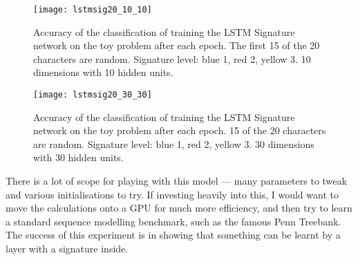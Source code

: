         \begin{figure}
	\texttt{[image: lstmsig20\_10\_10]}
          \caption[LSTM Signature training accuracy -- 10D with 10 hidden units]{Accuracy of the classification of training the LSTM Signature network on the toy problem after each epoch. The first 15 of the 20 characters are random. Signature level: blue 1, red 2, yellow 3. 10 dimensions with 10 hidden units.}
          \label{fig:lstmsig201010}
        \end{figure}
        \begin{figure}
	\texttt{[image: lstmsig20\_30\_30]}
          \caption[LSTM Signature training accuracy -- 30D with 30 hidden units]{Accuracy of the classification of training the LSTM Signature network on the toy problem after each epoch. 15 of the 20 characters are random. Signature level: blue 1, red 2, yellow 3. 30 dimensions with 30 hidden units.}
          \label{fig:lstmsig203030}
        \end{figure}

There is a lot of scope for playing with this model --- many parameters to tweak and various initialisations to try. If investing heavily into this, I would want to move the calculations onto a GPU for much more efficiency, and then try to learn a standard sequence modelling benchmark, such as the famous Penn Treebank. The success of this experiment is in showing that something can be learnt by a layer with a signature inside.
\endDocumentJR
